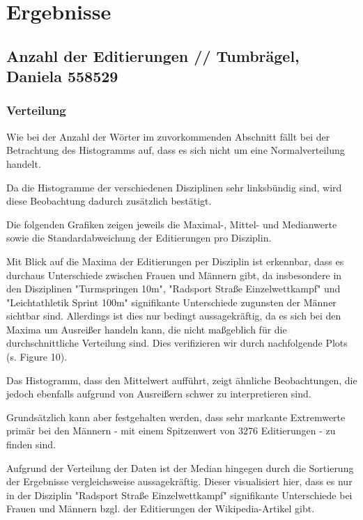 \documentclass[11pt]{article}
\begin{document}
\section {Ergebnisse}
\subsection{Anzahl der Editierungen // Tumbrägel, Daniela 558529}
\subsubsection{Verteilung}
Wie bei der Anzahl der Wörter im zuvorkommenden Abschnitt fällt bei der Betrachtung des Histogramms auf, dass es sich nicht um eine Normalverteilung handelt.

Da die Histogramme der verschiedenen Disziplinen sehr linksbündig sind, wird diese Beobachtung dadurch zusätzlich bestätigt. 

Die folgenden Grafiken zeigen jeweils die Maximal-, Mittel- und Medianwerte sowie die Standardabweichung der Editierungen pro Disziplin. 

Mit Blick auf die Maxima der Editierungen per Disziplin ist erkennbar, dass es durchaus Unterschiede zwischen Frauen und Männern gibt, da insbesondere in den Disziplinen "Turmspringen 10m", "Radsport Straße Einzelwettkampf" und "Leichtathletik Sprint 100m" signifikante Unterschiede zugunsten der Männer sichtbar sind. Allerdings ist dies nur bedingt aussagekräftig, da es sich bei den Maxima um Ausreißer handeln kann, die nicht maßgeblich für die durchschnittliche Verteilung sind. Dies verifizieren wir durch nachfolgende Plots (s. Figure 10).

Das Histogramm, dass den Mittelwert aufführt, zeigt ähnliche Beobachtungen, die jedoch ebenfalls aufgrund von Ausreißern schwer zu interpretieren sind.

Grundsätzlich kann aber festgehalten werden, dass sehr markante Extremwerte primär bei den Männern - mit einem Spitzenwert von 3276 Editierungen - zu finden sind.

Aufgrund der Verteilung der Daten ist der Median hingegen durch die Sortierung der Ergebnisse vergleichsweise aussagekräftig. Dieser visualisiert hier, dass es nur in der Disziplin "Radsport Straße Einzelwettkampf" signifikante Unterschiede bei Frauen und Männern bzgl. der Editierungen der Wikipedia-Artikel gibt.
\end{document}
